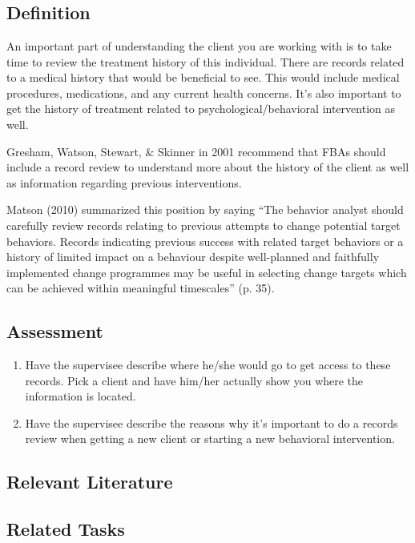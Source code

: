 \clearpage \section[\fourgOne{}]{\fourgOne{}%
              }
\subsection{Definition}
An important part of understanding the client you are working with is to take time to review the treatment history of this individual. There are records related to a medical history that would be beneficial to see. This would include medical procedures, medications, and any current health concerns. It's also important to get the history of treatment related to psychological/behavioral intervention as well. 

Gresham, Watson, Stewart, \& Skinner in 2001 recommend that FBAs should include a record review to understand more about the history of the client as well as information regarding previous interventions. 

Matson (2010) summarized this position by saying ``The behavior analyst should carefully review records relating to previous attempts to change potential target behaviors. Records indicating previous success with related target behaviors or a history of limited impact on a behaviour despite well-planned and faithfully implemented change programmes may be useful in selecting change targets which can be achieved within meaningful timescales'' (p. 35).

\subsection{Assessment}
\begin{enumerate}
\item Have the supervisee describe where he/she would go to get access to these records. Pick a client and have him/her actually show you where the information is located.
\item Have the supervisee describe the reasons why it's important to do a records review when getting a new client or starting a new behavioral intervention.
\end{enumerate}
%
\subsection{Relevant Literature}
\begin{refsection}
\nocite{watson2001functional,
        matson2009applied}
\printbibliography[heading=none]
\end{refsection}
%
\subsection{Related Tasks}
\fourgOne{}\\
\fourgTwo{}\\
\fourgThree{}\\
\fourgFour{}\\
\fourgFive{}\\
\fourgSix{}\\
\fourgSeven{}\\
\fouriThree{}\\
\fouriFour{}\\
\fourkOne{}\\
